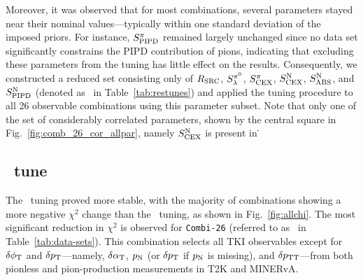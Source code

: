    Moreover, it was observed that for most combinations, several parameters stayed near their nominal values—typically within one standard deviation of the imposed priors. 
    For instance, $S_\textrm{PIPD}^{\pi}$ remained largely unchanged since no data set significantly constrains the PIPD contribution of pions, indicating that excluding these parameters from the tuning has little effect on the results.
    Consequently, we constructed a reduced set consisting only of $R_\textrm{SRC}$, $S_\lambda^{\pi^{0}}$, $S_\textrm{CEX}^{\pi}$, $S_\textrm{CEX}^\textrm{N}$, $S_\textrm{ABS}^\textrm{N}$, and $S_\textrm{PIPD}^\textrm{N}$ (denoted as \redpar\ in Table~\ref{tab:restunes}) and applied the tuning procedure to all 26 observable combinations using this parameter subset.
    Note that only one of the set of considerably correlated parameters, shown by the central square in Fig.~\ref{fig:comb_26_cor_allpar}, namely $S_\textrm{CEX}^\textrm{N}$ is present in \redpar\. 


    \subsection{\redpar\ tune}
    The \redpar\ tuning proved more stable, with the majority of combinations showing a more negative $\chi^2$ change than the \allpar\ tuning, as shown in Fig.~\ref{fig:allchi}. 
    The most significant reduction in $\chi^2$ is observed for \texttt{Combi-26} (referred to as \cbRedPar\ in Table~\ref{tab:data-sets}). 
    This combination selects all TKI observables except for $\delta\phi_\textrm{T}$ and $\delta p_\textrm{T}$—namely, $\delta\alpha_\textrm{T}$, $p_\textrm{N}$ (or $\delta p_\textrm{T}$ if $p_\textrm{N}$ is missing), and $\delta p_\textrm{TT}$—from both pionless and pion-production measurements in T2K and MINERvA.

